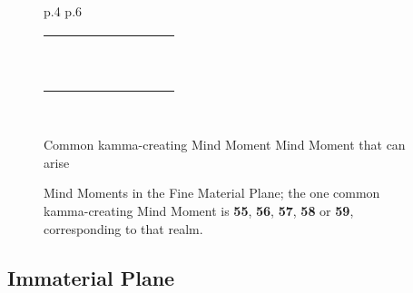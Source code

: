 \begin{figure}[H]
\begin{tabular}{L{\dimexpr.4\tabcolsep} R{\dimexpr.6\tabcolsep}}
\begin{tabular}{p{} p{}
p{}
R{.077\textwidth} |
p{.039\textwidth}
p{.039\textwidth}
p{.039\textwidth}
p{.039\textwidth}
p{.039\textwidth}}
\\
& &  &  & & & & &
\\
& &  &  & & & & & \tm
\\\midrule
{} &  &  &  & \tm & & & &
\\
& &  &  & & \tm & & &
\\
& &  &  & & & \tm & &
\\
& &  &  & & & & \tm &
\\
&  &  &  & & \tm & & &
\\
& &  &  & & & \tm & &
\\
& &  &  & & & & \tm &
\\
& &  &  & & & & & \tm
\\
\bottomrule
\end{tabular}
\\
\end{tabular}
\begin{center}
\tmcommon\hspace{2mm} Common kamma-creating Mind Moment \hspace{5mm} \tm\hspace{2mm} Mind Moment that can arise
\end{center}
\caption{Mind Moments in the Fine Material Plane; the one common kamma-creating Mind Moment is \textbf{55}, \textbf{56}, \textbf{57}, \textbf{58} or \textbf{59}, corresponding to that realm.}
\label{fig:Fine}
\end{figure}

\subsection*{Immaterial Plane}

